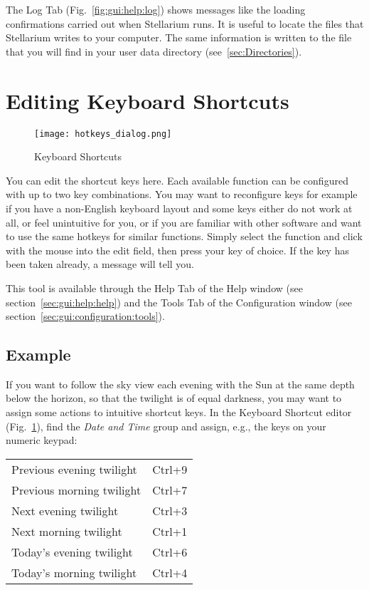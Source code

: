 The Log Tab (Fig.~\ref{fig:gui:help:log}) shows messages like the loading confirmations carried out when
Stellarium runs. It is useful to locate the files that Stellarium writes
to your computer. The same information is written to  the file  that you will
find in your user data directory (see~\ref{sec:Directories}).


\section{Editing Keyboard Shortcuts}
\label{sec:gui:help:hotkeys}

\begin{figure}[htbp]
\centering\texttt{[image: hotkeys\_dialog.png]}
\caption{Keyboard Shortcuts}
\label{fig:gui:hotkeys}
\end{figure}

You can edit the shortcut keys here. Each available function can be
configured with up to two key combinations. You may want to
reconfigure keys for example if you have a non-English keyboard layout
and some keys either do not work at all, or feel unintuitive for you,
or if you are familiar with other software and want to use the same
hotkeys for similar functions. Simply select the function and click
with the mouse into the edit field, then press your key of choice. If
the key has been taken already, a message will tell you.

This tool is available through the Help Tab of the Help window (see section~\ref{sec:gui:help:help}) and the
Tools Tab of the Configuration window (see section~\ref{sec:gui:configuration:tools}).

\subsection{Example}
\label{sec:gui:help:hotkeys:example}

If you want  to follow the sky view each evening
with the Sun at the same depth below the horizon, so that the twilight
is of equal darkness, you may want to assign some actions to intuitive
shortcut keys. In the Keyboard Shortcut editor
(Fig.~\ref{fig:gui:hotkeys}), find the \emph{Date and Time} group and
assign, e.g., the keys on your numeric keypad:

\begin{tabular}{ll}
  Previous evening twilight & Ctrl+9 \\
  Previous morning twilight & Ctrl+7 \\
  Next evening twilight     & Ctrl+3 \\
  Next morning twilight     & Ctrl+1 \\
  Today's evening twilight  & Ctrl+6 \\
  Today's morning twilight  & Ctrl+4 \\
\end{tabular}









